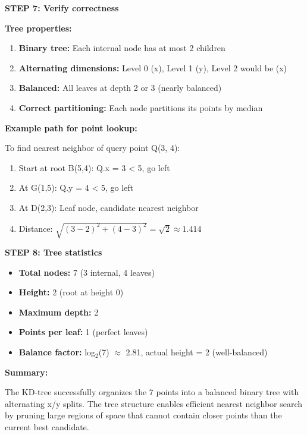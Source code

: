 \documentclass[12pt]{article}
\begin{document}
\begin{solution}
\textbf{STEP 7: Verify correctness}

\textbf{Tree properties:}
\begin{enumerate}
    \item \textbf{Binary tree:} Each internal node has at most 2 children \checkmark
    \item \textbf{Alternating dimensions:} Level 0 (x), Level 1 (y), Level 2 would be (x) \checkmark
    \item \textbf{Balanced:} All leaves at depth 2 or 3 (nearly balanced) \checkmark
    \item \textbf{Correct partitioning:} Each node partitions its points by median \checkmark
\end{enumerate}

\textbf{Example path for point lookup:}

To find nearest neighbor of query point Q(3, 4):
\begin{enumerate}
    \item Start at root B(5,4): Q.x = 3 < 5, go left
    \item At G(1,5): Q.y = 4 < 5, go left
    \item At D(2,3): Leaf node, candidate nearest neighbor
    \item Distance: $\sqrt{(3-2)^2 + (4-3)^2} = \sqrt{2} \approx 1.414$
\end{enumerate}

\textbf{STEP 8: Tree statistics}

\begin{itemize}
    \item \textbf{Total nodes:} 7 (3 internal, 4 leaves)
    \item \textbf{Height:} 2 (root at height 0)
    \item \textbf{Maximum depth:} 2
    \item \textbf{Points per leaf:} 1 (perfect leaves)
    \item \textbf{Balance factor:} log$_2$(7) $\approx$ 2.81, actual height = 2 (well-balanced)
\end{itemize}

\textbf{Summary:}

The KD-tree successfully organizes the 7 points into a balanced binary tree with alternating x/y splits. The tree structure enables efficient nearest neighbor search by pruning large regions of space that cannot contain closer points than the current best candidate.
\end{solution}
\end{document}
